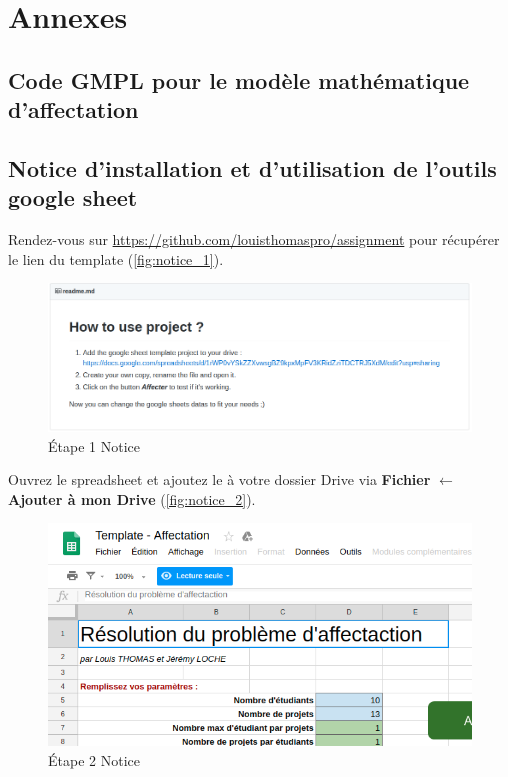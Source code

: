 \documentclass[final,poster]{polytech/polytech}
\begin{document}


\chapter*{Annexes}

\section{Code GMPL pour le modèle mathématique d'affectation\label{src:gmpl_source_model}}



\section{Notice d'installation et d'utilisation de l'outils google sheet\label{src:notice_utilisation}}


Rendez-vous sur \url{https://github.com/louisthomaspro/assignment} pour récupérer le lien du template (\autoref{fig:notice_1}).
\begin{figure}[htbp]
\includegraphics[width=13cm]{images/notice/notice_1}
\caption{\label{fig:notice_1}\'Etape 1 Notice}
\end{figure}

Ouvrez le spreadsheet et ajoutez le à votre dossier Drive via \textbf{Fichier} $\leftarrow$ \textbf{Ajouter à mon Drive} (\autoref{fig:notice_2}).
\begin{figure}[htbp]
\includegraphics[width=13cm]{images/notice/notice_2}
\caption{\label{fig:notice_2}\'Etape 2 Notice}
\end{figure}
\end{document}
